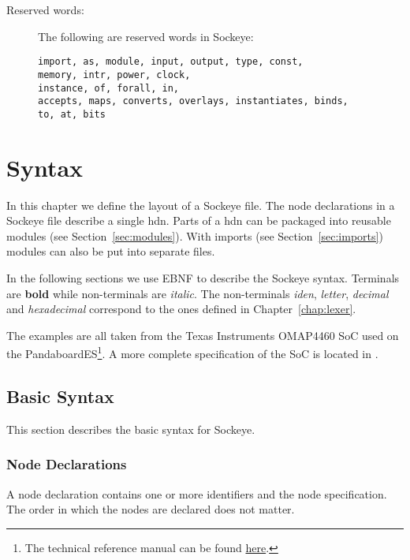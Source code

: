 \documentclass[a4paper,11pt,twoside]{report}
\begin{document}
{{{\begin{description}
\item[Reserved words:] The following are reserved words in Sockeye:
\begin{verbatim}
import, as, module, input, output, type, const,
memory, intr, power, clock,
instance, of, forall, in,
accepts, maps, converts, overlays, instantiates, binds,
to, at, bits
\end{verbatim}

\end{description}

\chapter{Syntax}
\label{chap:declaration}

In this chapter we define the layout of a Sockeye file.
The node declarations in a Sockeye file describe a single \gls{hdn}.
Parts of a \gls{hdn} can be packaged into reusable modules (see Section~\ref{sec:modules}).
With imports (see Section~\ref{sec:imports}) modules can also be put into separate files.

In the following sections we use EBNF to describe the Sockeye syntax. Terminals are \textbf{bold} while non-terminals are \textit{italic}.
The non-terminals \textit{iden}, \textit{letter}, \textit{decimal} and \textit{hexadecimal} correspond to the ones defined in Chapter~\ref{chap:lexer}.

The examples are all taken from the Texas Instruments OMAP4460 SoC used on the PandaboardES\footnote{The technical reference manual can be found \href{http://www.
ti.com/lit/ug/swpu235ab/swpu235ab.pdf}{here}.}.
A more complete specification of the SoC is located in .

\section{Basic Syntax}
This section describes the basic syntax for Sockeye.


\subsection{Node Declarations}
A node declaration contains one or more identifiers and the node specification.
The order in which the nodes are declared does not matter.

}}}
\end{document}

